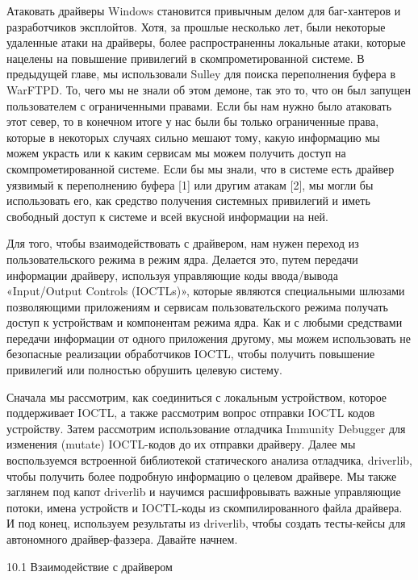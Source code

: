 \documentclass[12pt]{book}
\begin{document}
Атаковать драйверы Windows становится привычным делом для баг-хантеров и разработчиков эксплойтов. Хотя, за прошлые несколько лет, были некоторые удаленные атаки на драйверы, более распространенны локальные атаки, которые нацелены на повышение привилегий в скомпрометированной системе. В предыдущей главе, мы использовали Sulley для поиска переполнения буфера в WarFTPD. То, чего мы не знали об этом демоне, так это то, что он был запущен пользователем с ограниченными правами. Если бы нам нужно было атаковать этот север, то в конечном итоге у нас были бы только ограниченные права, которые в некоторых случаях сильно мешают тому, какую информацию мы можем украсть или к каким сервисам мы можем получить доступ на скомпрометированной системе. Если бы мы знали, что в системе есть драйвер уязвимый к переполнению буфера [1] или другим атакам [2], мы могли бы использовать его, как средство получения системных привилегий и иметь свободный доступ к системе и всей вкусной информации на ней.

Для того, чтобы взаимодействовать с драйвером, нам нужен переход из пользовательского режима в режим ядра. Делается это, путем передачи информации драйверу, используя управляющие коды ввода/вывода «Input/Output Controls (IOCTLs)», которые являются специальными шлюзами позволяющими приложениям и сервисам пользовательского режима получать доступ к устройствам и компонентам режима ядра. Как и с любыми средствами передачи информации от одного приложения другому, мы можем использовать не безопасные реализации обработчиков IOCTL, чтобы получить повышение привилегий или полностью обрушить целевую систему.

Сначала мы рассмотрим, как соединиться с локальным устройством, которое поддерживает IOCTL, а также рассмотрим вопрос отправки IOCTL кодов устройству. Затем рассмотрим использование отладчика Immunity Debugger для изменения (mutate) IOCTL-кодов до их отправки драйверу. Далее мы воспользуемся встроенной библиотекой статического анализа отладчика, driverlib, чтобы получить более подробную информацию о целевом драйвере. Мы также заглянем под капот driverlib и научимся расшифровывать важные управляющие потоки, имена устройств и IOCTL-коды из скомпилированного файла драйвера. И под конец, используем результаты из driverlib, чтобы создать тесты-кейсы для автономного драйвер-фаззера. Давайте начнем.


10.1 Взаимодействие с драйвером
\end{document}
